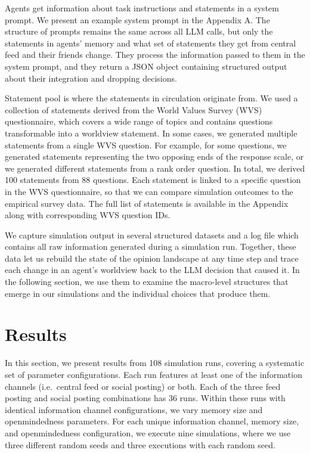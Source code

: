 \documentclass[]{ceurart}
\begin{document}
Agents get information about task instructions and statements in a
system prompt. We present an example system prompt in the Appendix A.
The structure of prompts remains the same across all LLM calls, but only
the statements in agents' memory and what set of statements they get
from central feed and their friends change. They process the information
passed to them in the system prompt, and they return a JSON object
containing structured output about their integration and dropping
decisions.

Statement pool is where the statements in circulation originate from. We
used a collection of statements derived from the World Values Survey
(WVS) questionnaire, which covers a wide range of topics and contains
questions transformable into a worldview statement. In some cases, we
generated multiple statements from a single WVS question. For example,
for some questions, we generated statements representing the two
opposing ends of the response scale, or we generated different
statements from a rank order question. In total, we derived 100
statements from 88 questions. Each statement is linked to a specific
question in the WVS questionnaire, so that we can compare simulation
outcomes to the empirical survey data. The full list of statements is
available in the Appendix along with corresponding WVS question IDs.

We capture simulation output in several structured datasets and a log
file which contains all raw information generated during a simulation
run. Together, these data let us rebuild the state of the opinion
landscape at any time step and trace each change in an agent's worldview
back to the LLM decision that caused it. In the following section, we
use them to examine the macro-level structures that emerge in our
simulations and the individual choices that produce them.

\section{Results}\label{results}

In this section, we present results from 108 simulation runs, covering a
systematic set of parameter configurations. Each run features at least
one of the information channels (i.e.~central feed or social posting) or
both. Each of the three feed posting and social posting combinations has
36 runs. Within these runs with identical information channel
configurations, we vary memory size and openmindedness parameters. For
each unique information channel, memory size, and openmindedness
configuration, we execute nine simulations, where we use three different
random seeds and three executions with each random seed.
\end{document}
